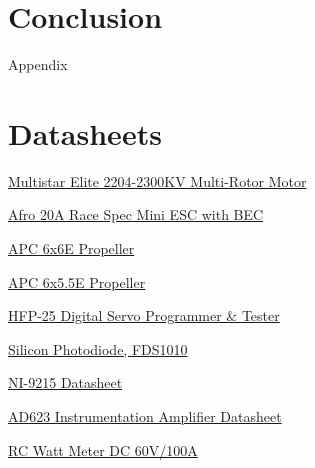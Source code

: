 \documentclass{article}
\begin{document}
\section{Conclusion}



\newpage
\thispagestyle{empty}  %
\begin{center}
	\vspace*{\fill}
	{\Huge Appendix}
	\vspace*{\fill}
\end{center}

\newpage
\begin{appendices}
\pagestyle{fancy}
\renewcommand{\thefigure}{A\arabic{figure}}
\setcounter{figure}{0}

\pagebreak

\hypertarget{datasheets}{}
\section{Datasheets}
\begin{enumerate}[label = {[\arabic*]}]
\small
\item \hypertarget{1}{\href{https://hobbyking.com/en_us/multistar-elite-2204-2300kv-multi-rotor-motor-cw-prop-adapter.html}{Multistar Elite 2204-2300KV Multi-Rotor Motor}}
\item \hypertarget{2}{\href{https://hobbyking.com/en_us/afro-20a-race-spec-mini-esc-with-bec.html}{ Afro 20A Race Spec Mini ESC with BEC}}
\item \hypertarget{3}{\href{https://www.apcprop.com/product/6x6e/}{APC 6x6E Propeller}}
\item \hypertarget{4}{\href{https://www.apcprop.com/product/6x5-5e/}{APC 6x5.5E Propeller}}
\item \hypertarget{5}{\href{https://hitecrcd.com/products/servos/discontinued-servos-servo-accessories/discontinued-programmers/hfp-25-digital-servo-programmer-tester-2/product}{HFP-25 Digital Servo Programmer \& Tester}}
\item \hypertarget{6}{\href{https://www.thorlabs.com/drawings/e7e91d1f442ec5dc-834C7101-FD1F-1B62-609D921F0FC0E314/FDS1010-SpecSheet.pdf}{Silicon Photodiode, FDS1010}}
\item \hypertarget{7}{\href{https://www.amc-systeme.de/files/pdf/ni-9215-amc.pdf}{NI-9215 Datasheet}}
\item \hypertarget{8}{\href{https://www.analog.com/media/en/technical-documentation/data-sheets/ad623.pdf}{AD623 Instrumentation Amplifier Datasheet}}
\item \hypertarget{9}{\href{https://www.amazon.com/Analyzer-Digital-Balance-Battery-Voltage/dp/B0753DPC2D/ref=asc_df_B0753DPC2D/?tag=hyprod-20&linkCode=df0&hvadid=309806250188&hvpos=&hvnetw=g&hvrand=1339579772044864897&hvpone=&hvptwo=&hvqmt=&hvdev=c&hvdvcmdl=&hvlocint=&hvlocphy=9028280&hvtargid=pla-567839154382&psc=1&mcid=0273f08627a23b188506d62979b40559&gclid=CjwKCAjw57exBhAsEiwAaIxaZg9oUrMDzZ3wh-Y_MJXKuUsgDDHnvtvx1OtjC213FpZroDuJ3cO4sBoCM-YQAvD_BwE}{RC Watt Meter DC 60V/100A }}
\end{enumerate}

\end{appendices}
\end{document}
